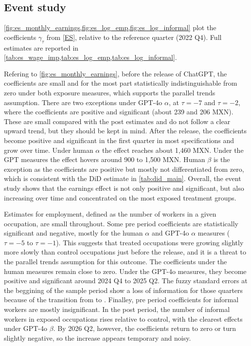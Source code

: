 \subsection{Event study}\label{subsec:event}

\cref{fig:es_monthly_earnings,fig:es_log_emp,fig:es_log_informal} plot the coefficients $\gamma_\tau$ from \cref{ES}, relative to the reference quarter (2022 Q4). Full estimates are reported in \cref{tab:es_wage_imp,tab:es_log_emp,tab:es_log_informal}.

Refering to \cref{fig:es_monthly_earnings}, before the release of ChatGPT, the coefficients are small and for the most part statistically indistinguishable from zero under both exposure measures, which supports the parallel trends assumption. There are two exceptions under GPT-4o $\alpha$, at $\tau=-7$ and $\tau=-2$, where the coefficients are positive and significant (about 239 and 206 MXN). These are small compared with the post estimates and do not follow a clear upward trend, but they should be kept in mind. After the release, the coefficients become positive and significant in the first quarter in most specifications and grow over time. Under human $\alpha$ the effect reaches about 1{,}460 MXN. Under the GPT measures the effect hovers around 900 to 1{,}500 MXN. Human $\beta$ is the exception as the coefficients are positive but mostly not differentiated from zero, which is consistent with the DiD estimate in \cref{tab:did_main}. Overall, the event study shows that the earnings effect is not only positive and significant, but also increasing over time and concentrated on the most exposed treatment groups.

Estimates for employment, defined as the number of workers in a given occupation, are small throughout. Some pre period coefficients are statistically significant and negative, mostly for the human $\alpha$ and GPT-4o $\alpha$ measures ($\tau=-5$ to $\tau=-1$). This suggests that treated occupations were growing slightly more slowly than control occupations just before the release, and it is a threat to the parallel trends assumption for this outcome. The coefficients under the human measures remain close to zero. Under the GPT-4o measures, they become positive and significant around 2024 Q4 to 2025 Q2. The fuzzy standard errors at the beggining of the sample period show a loss of information for those quarters because of the transition from  to .
Finalley, pre period coefficients for informal workers are mostly insignificant. In the post period, the number of informal workers in exposed occupations rises relative to control, with the clearest effects under GPT-4o $\beta$. By 2026 Q2, however, the coefficients return to zero or turn slightly negative, so the increase appears temporary and noisy.

